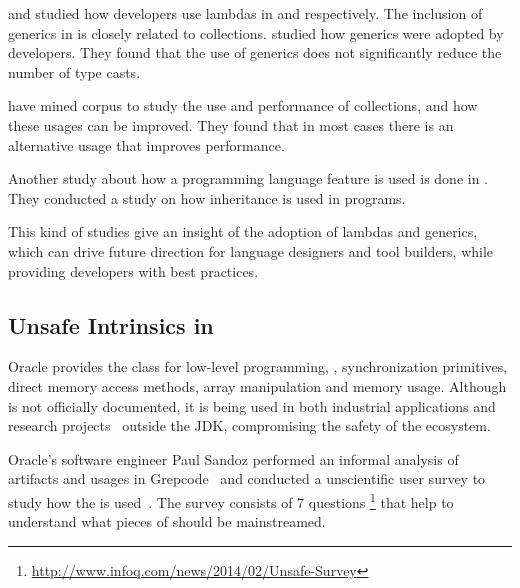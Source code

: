 \cite{mazinanianUnderstandingUseLambda2017} and \cite{uesbeckEmpiricalStudyImpact2016} studied how developers use lambdas in \java{} and \cpp{} respectively.
The inclusion of generics in \java{} is closely related to collections. 
\cite{parninJavaGenericsAdoption2011,parninAdoptionUseJava2013} studied how generics were adopted by \java{} developers.
They found that the use of generics does not significantly reduce the number of type casts.

\cite{costaEmpiricalStudyUsage2017} have mined \github{} corpus to study the use and performance of collections,
and how these usages can be improved.
They found that in most cases there is an alternative usage that improves performance.

Another study about how a programming language feature is used is done in
\cite{temperoHowJavaPrograms2008}.
They conducted a study on how inheritance is used in \java{} programs.

This kind of studies give an insight of the adoption of lambdas and generics, which can drive future direction for language designers and tool builders, while providing developers with best practices.

\subsection{Unsafe Intrinsics in \java{}}
\label{sec:literature-review:unsafe}

Oracle provides the \smu{} class for low-level programming,
\eg{}, synchronization primitives, direct memory access methods,
array manipulation and memory usage.
Although \smu{} is not officially documented,
it is being used in both industrial applications
and research projects~\citep{korlandNoninvasiveConcurrencyJava2010,pukallFlexibleDynamicSoftware,gligoricCoDeSeFastDeserialization2011}
outside the JDK, compromising the safety of the \java{} ecosystem.

Oracle's software engineer Paul Sandoz performed an informal analysis of
\mavencentral{} artifacts and usages in Grepcode~\citep{sandoz-personal-communication}
and conducted a unscientific user survey to study how the \unsafe{} \api{} is used~\citep{psandoz14}.
The survey consists of 7 questions%
\footnote{\url{http://www.infoq.com/news/2014/02/Unsafe-Survey}} 
that help to understand what pieces of \smu{} should be mainstreamed.

